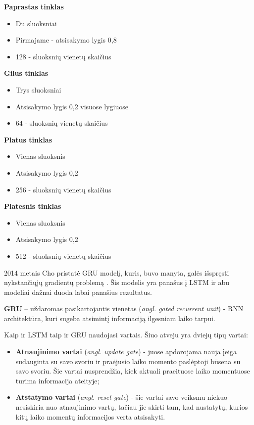 \documentclass{VUMIFPSbakalaurinis}
\begin{document}
\textbf{Paprastas tinklas}
\begin{itemize}
	\item Du sluoksniai
	\item Pirmajame - atsisakymo lygis 0,8
	\item 128 - sluoksnių vienetų skaičius
\end{itemize}

\textbf{Gilus tinklas}
\begin{itemize}
	\item Trys sluoksniai
	\item Atsisakymo lygis 0,2 visuose lygiuose
	\item 64 - sluoksnių vienetų skaičius
\end{itemize}

\textbf{Platus tinklas}
\begin{itemize}
	\item Vienas sluoksnis
	\item Atsisakymo lygis 0,2
	\item 256 - sluoksnių vienetų skaičius
\end{itemize}

\textbf{Platesnis tinklas}
\begin{itemize}
	\item Vienas sluoksnis
	\item Atsisakymo lygis 0,2
	\item 512 - sluoksnių vienetų skaičius
\end{itemize}

2014 metais Cho pristatė GRU modelį, kuris, buvo manyta, galės išspręsti nykstančiųjų gradientų problemą \cite{DBLP:journals/corr/ChoMGBSB14}. Šis modelis yra panašus į LSTM ir abu modeliai dažnai duoda labai panašius rezultatus.

\textbf{GRU} – uždaromas pasikartojantis vienetas (\textit{angl. gated recurrent unit}) - RNN architektūra, kuri sugeba atsimintį informaciją ilgesniam laiko tarpui. 

Kaip ir LSTM taip ir GRU naudojasi vartais. Šiuo atveju yra dviejų tipų vartai:
\begin{itemize}
	\item \textbf{Atnaujinimo vartai} (\textit{angl. update gate}) - juose apdorojama nauja įeiga sudauginta su savo svoriu ir praėjusio laiko momento paslėptoji būsena su savo svoriu. Šie vartai nusprendžia, kiek aktuali praeituose laiko momentuose turima informacija ateityje;
	\item \textbf{Atstatymo vartai} (\textit{angl. reset gate}) - šie vartai savo veiksmu niekuo nesiskiria nuo atnaujinimo vartų, tačiau jie skirti tam, kad nustatytų, kurios kitų laiko momentų informacijos verta atsisakyti.
\end{itemize}
\end{document}
